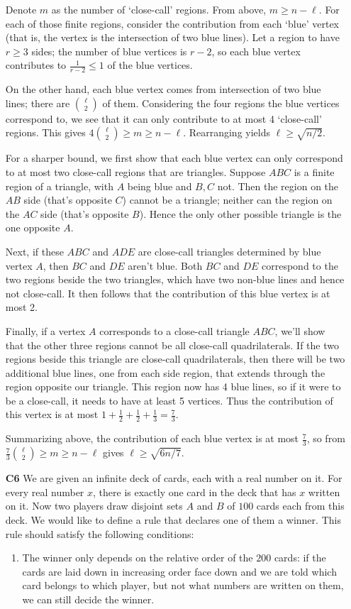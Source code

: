 \documentclass[11pt,a4paper]{article}
\begin{document}
\begin{enumerate}
	Denote $m$ as the number of `close-call' regions. 
	From above, $m\ge n - \ell$. 
	For each of those finite regions, consider the contribution from each `blue' vertex (that is, the vertex is the intersection of two blue lines). 
	Let a region to have $r\ge 3$ sides; the number of blue vertices is $r-2$, 
	so each blue vertex contributes to $\frac{1}{r-2}\le 1$ of the blue vertices. 
	
	On the other hand, each blue vertex comes from intersection of two blue lines; 
	there are $\binom{\ell}{2}$ of them. 
	Considering the four regions the blue vertices correspond to, 
	we see that it can only contribute to at most 4 `close-call' regions. 
	This gives $4\binom{\ell}{2}\ge m\ge n-\ell$. 
	Rearranging yields $\ell\ge \sqrt{n/2}$. 
	
	For a sharper bound, we first show that each blue vertex can only correspond to at most two close-call regions that are triangles. 
	Suppose $ABC$ is a finite region of a triangle, with $A$ being blue and $B, C$ not. 
	Then the region on the $AB$ side (that's opposite $C$) cannot be a triangle; neither can the region on the $AC$ side (that's opposite $B$). 
	Hence the only other possible triangle is the one opposite $A$. 
	
	Next, if these $ABC$ and $ADE$ are close-call triangles determined by blue vertex $A$, then $BC$ and $DE$ aren't blue. 
	Both $BC$ and $DE$ correspond to the two regions beside the two triangles, 
	which have two non-blue lines and hence not close-call. 
	It then follows that the contribution of this blue vertex is at most 2. 
	
	Finally, if a vertex $A$ corresponds to a close-call triangle $ABC$, we'll show that the other three regions cannot be all close-call quadrilaterals. 
	If the two regions beside this triangle are close-call quadrilaterals, then there will be two additional blue lines, 
	one from each side region,
	that extends through the region opposite our triangle. 
	This region now has 4 blue lines, so if it were to be a close-call, it needs to have at least 5 vertices. 
	Thus the contribution of this vertex is at most $1 + \frac 12 + \frac 12 + \frac 13=\frac 73$. 
	
	Summarizing above, the contribution of each blue vertex is at most $\frac 73$, 
	so from $\frac 73\binom{\ell}{2}\ge m\ge n-\ell$ gives $\ell\ge \sqrt{6n/7}$. 
	
	\item [\textbf{C6}] We are given an infinite deck of cards, each with a real number on it. For every real number $x$, there is exactly one card in the deck that has $x$ written on it. Now two players draw disjoint sets $A$ and $B$ of $100$ cards each from this deck. We would like to define a rule that declares one of them a winner. This rule should satisfy the following conditions:
	\begin{enumerate}
		\item The winner only depends on the relative order of the $200$ cards: if the cards are laid down in increasing order face down and we are told which card belongs to which player, but not what numbers are written on them, we can still decide the winner.
		

\end{enumerate}
\end{enumerate}
\end{document}
